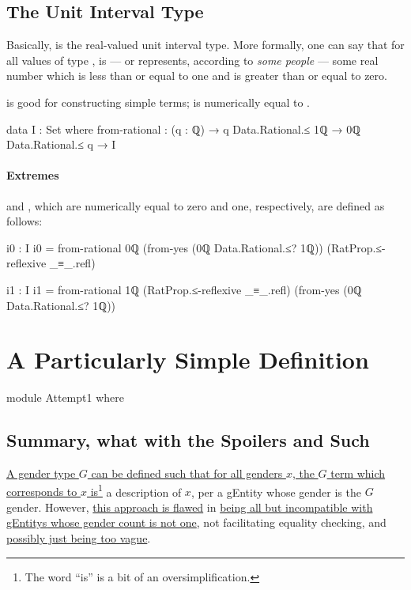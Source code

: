 \documentclass{article}
\theoremstyle{remark}
\newcommand{\summaryLink}[2]{\hyperref[#1]{#2}}
\begin{document}
\subsection{The Unit Interval Type}
Basically,  is the real-valued unit interval type.  More formally, one can say that for all values  of type ,  is --- or represents, according to \emph{some people} --- some real number which is less than or equal to one and is greater than or equal to zero.

 is good for constructing simple  terms;     is numerically equal to .

\begin{code}
data I : Set where
  from-rational :
    (q : ℚ) → q Data.Rational.≤ 1ℚ → 0ℚ Data.Rational.≤ q → I
\end{code}

\paragraph{Extremes}
 and , which are numerically equal to zero and one, respectively, are defined as follows:

\begin{code}
i0 : I
i0 = from-rational 0ℚ
                   (from-yes (0ℚ Data.Rational.≤? 1ℚ))
                   (RatProp.≤-reflexive _≡_.refl)

i1 : I
i1 = from-rational 1ℚ
                   (RatProp.≤-reflexive _≡_.refl)
                   (from-yes (0ℚ Data.Rational.≤? 1ℚ))
\end{code}

\section{A Particularly Simple Definition}

\begin{code}
module Attempt1 where
\end{code}

\subsection{Summary, what with the Spoilers and Such}
\summaryLink{sec:gender1definition}{A gender type \(G\) can be defined such that for all genders \(x\), the \(G\) term which corresponds to \(x\) is\footnote{The word ``is'' is a bit of an oversimplification.} a description of \(x\), per a \gls{gEntity} whose gender is the \(G\) gender.}  However, \summaryLink{sec:gender1flaws}{this approach is flawed} in \summaryLink{sec:gender1non1gender}{being all but incompatible with \glspl{gEntity} whose gender count is not one}, not facilitating equality checking, and \summaryLink{sec:gender1vagueness}{possibly just being too vague}.
\end{document}
